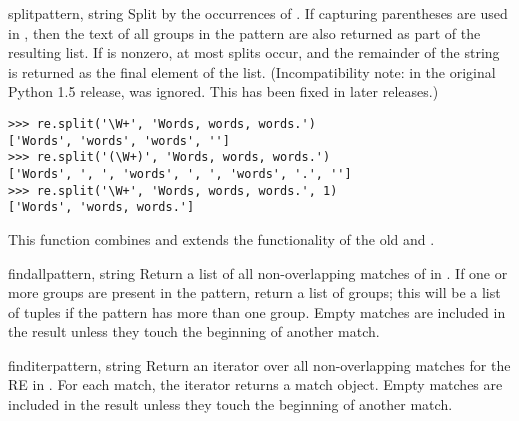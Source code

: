\begin{funcdesc}{split}{pattern, string}
  Split  by the occurrences of .  If
  capturing parentheses are used in , then the text of all
  groups in the pattern are also returned as part of the resulting list.
  If  is nonzero, at most  splits
  occur, and the remainder of the string is returned as the final
  element of the list.  (Incompatibility note: in the original Python
  1.5 release,  was ignored.  This has been fixed in
  later releases.)

\begin{verbatim}
>>> re.split('\W+', 'Words, words, words.')
['Words', 'words', 'words', '']
>>> re.split('(\W+)', 'Words, words, words.')
['Words', ', ', 'words', ', ', 'words', '.', '']
>>> re.split('\W+', 'Words, words, words.', 1)
['Words', 'words, words.']
\end{verbatim}

  This function combines and extends the functionality of
  the old  and .
\end{funcdesc}

\begin{funcdesc}{findall}{pattern, string}
  Return a list of all non-overlapping matches of  in
  .  If one or more groups are present in the pattern,
  return a list of groups; this will be a list of tuples if the
  pattern has more than one group.  Empty matches are included in the
  result unless they touch the beginning of another match.
\end{funcdesc}

\begin{funcdesc}{finditer}{pattern, string}
  Return an iterator over all non-overlapping matches for the RE
   in .  For each match, the iterator returns
  a match object.  Empty matches are included in the result unless they
  touch the beginning of another match.
\end{funcdesc}

